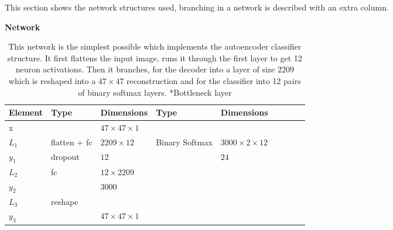 This section shows the network structures used, branching in a network is described
with an extra column.
\begin{table}[h!]
  \caption*{\textbf{Network \networkI}}
	\centering
	{\footnotesize
		\begin{tabular}{|lllllllll|}
			\hline
			\multicolumn{1}{|l|}{Element} & Type    & \multicolumn{1}{l|}{Dimensions}           & Type           & \multicolumn{1}{l|}{Dimensions}            \\ \hline
			\multicolumn{1}{|l|}{x}       &         & \multicolumn{1}{l|}{$47\times47\times1$}  &                & \multicolumn{1}{l|}{}                      \\ \hline
			\multicolumn{1}{|l|}{$L_1$}   & flatten + fc      & \multicolumn{1}{l|}{$2209\times12$}       & Binary Softmax & \multicolumn{1}{l|}{$3000\times2\times12$} \\
			\multicolumn{1}{|l|}{$y_1$}   & dropout & \multicolumn{1}{l|}{$12$}                 &                & \multicolumn{1}{l|}{$24$}                  \\ \hline
			\multicolumn{1}{|l|}{$L_2$}   & fc      & \multicolumn{1}{l|}{$12\times2209$}       &                & \multicolumn{1}{l|}{}                      \\
			\multicolumn{1}{|l|}{$y_2$}   &         & \multicolumn{1}{l|}{$3000$}               &                & \multicolumn{1}{l|}{}                      \\ \hline
			\multicolumn{1}{|l|}{$L_3$}   & reshape & \multicolumn{1}{l|}{}                     &                & \multicolumn{1}{l|}{}                      \\
			\multicolumn{1}{|l|}{$y_3$}   &         & \multicolumn{1}{l|}{$47\times47\times 1$} &                & \multicolumn{1}{l|}{}                      \\ \hline
		\end{tabular}

		\caption{This network is the simplest possible which implements the autoencoder classifier structure.
    It first flattens the input image, runs it through the first layer to get 12 neuron activations.
    Then it branches, for the decoder into a layer of size $2209$ which is reshaped into a $47\times47$ reconstruction and for the classifier into 12 pairs of binary softmax layers.
    *Bottleneck layer} \label{tab:netI}

	}
\end{table}

